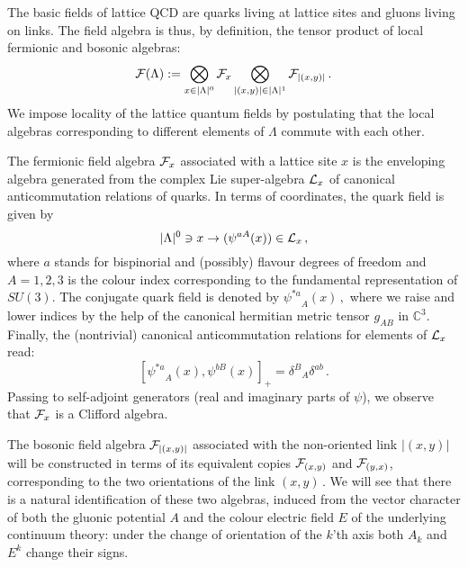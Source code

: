 \documentclass[a4paper,12pt]{article}
\begin{document}
The basic fields of lattice QCD are quarks living at lattice sites
and gluons living on links. The field algebra is thus, by
definition, the tensor product of local fermionic and bosonic
algebras:
\begin{equation}
\label{fieldalgebra} {\cal F}(\Lambda) :=  \bigotimes_{x \in
|\Lambda |^0} {\cal F}_x \bigotimes_{|(x,y)| \in |\Lambda |^1}
{\cal F}_{|(x,y)|} \, .
\end{equation}
We impose locality of the lattice quantum fields by postulating
that the local algebras corresponding to different elements of
$\Lambda$ commute with each other.

The fermionic field algebra ${\cal F}_x$ associated with a lattice
site $x$ is the enveloping algebra generated from the complex Lie
super-algebra ${\cal L}_x$ of canonical anticommutation relations
of quarks. In terms of coordinates, the quark field is given by
\begin{equation}
|{\Lambda}|^0 \ni x \rightarrow  ({\psi}^{aA}(x)) \in {\cal L}_x
\, ,
\end{equation}
where $a$ stands for bispinorial and (possibly) flavour degrees of
freedom and $A = 1,2,3$ is the colour index corresponding to the
fundamental representation of $SU(3)$. The conjugate quark field
is denoted by ${\psi^{*a}}_{A}(x)  \, ,$ where we raise and lower
indices by the help of the canonical hermitian metric tensor
$g_{AB}$ in $\mathbb C^3$. Finally, the (nontrivial) canonical
anticommutation relations for elements of ${\cal L}_x$ read:
\begin{equation}
\label{CCR3} [{\psi^{*a}}_{A}(x), \psi^{bB}(x)]_+ = {\delta^B}_A
\delta^{ab} \, .
\end{equation}
Passing to self-adjoint generators (real and imaginary parts of
$\psi$), we observe that ${\cal F}_x$ is a Clifford algebra.


The bosonic field algebra ${\cal F}_{|(x,y)|}$ associated with the
non-oriented link $|(x,y)|$ will be constructed in terms of its
equivalent copies ${\cal F}_{(x,y)}$ and ${\cal F}_{(y,x)}$,
corresponding to the two orientations of the link $(x,y)\, .$ We
will see that there is a natural identification of these two
algebras, induced from the vector character of both the gluonic
potential $A$ and the colour electric field $E$ of the underlying
continuum theory: under the change of orientation of the $k$'th
axis both $A_k$ and $E^k$ change their signs.
\end{document}
